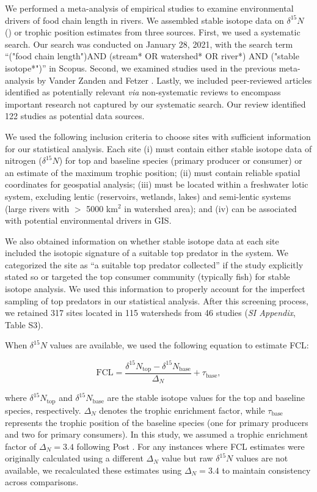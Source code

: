 \documentclass[11pt, class=article, crop=false]{standalone}
\begin{document}
We performed a meta-analysis of empirical studies to examine environmental drivers of food chain length in rivers.
We assembled stable isotope data on $\delta^{15} N$ (\textperthousand) or trophic position estimates from three sources.
First, we used a systematic search. 
Our search was conducted on January 28, 2021, with the search term ``("food chain length")AND (stream* OR watershed* OR river*) AND ("stable isotope*")'' in Scopus.
Second, we examined studies used in the previous meta-analysis by Vander Zanden and Fetzer \citep{vander_zanden_global_2007}.
Lastly, we included peer-reviewed articles identified as potentially relevant \textit{via} non-systematic reviews to encompass important research not captured by our systematic search.
Our review identified 122 studies as potential data sources.

We used the following inclusion criteria to choose sites with sufficient information for our statistical analysis.
Each site (i) must contain either stable isotope data of nitrogen ($\delta^{15}N$) for top and baseline species (primary producer or consumer) or an estimate of the maximum trophic position; 
(ii) must contain reliable spatial coordinates for geospatial analysis; 
(iii) must be located within a freshwater lotic system, excluding lentic (reservoirs, wetlands, lakes) and semi-lentic systems (large rivers with $>$ 5000 km$^2$ in watershed area); and (iv) can be associated with potential environmental drivers in GIS.

We also obtained information on whether stable isotope data at each site included the isotopic signature of a suitable top predator in the system.
We categorized the site as ``a suitable top predator collected'' if the study explicitly stated so or targeted the top consumer community (typically fish) for stable isotope analysis.
We used this information to properly account for the imperfect sampling of top predators in our statistical analysis.
After this screening process, we retained 317 sites located in 115 watersheds from 46 studies (\textit{SI Appendix}, Table S3). 

When $\delta^{15}N$ values are available, we used the following equation to estimate FCL:

\begin{equation}
    \mbox{FCL} = \frac{\delta^{15}N_{\text{top}} - \delta^{15}N_{\text{base}}}{\Delta_N} + \tau_{\text{base}},
    \label{eq:fcl-si}
\end{equation}

where $\delta^{15}N_{\text{top}}$ and $\delta^{15}N_{\text{base}}$ are the stable isotope values for the top and baseline species, respectively.
$\Delta_{N}$ denotes the trophic enrichment factor, while $\tau_{\text{base}}$ represents the trophic position of the baseline species (one for primary producers and two for primary consumers). 
In this study, we assumed a trophic enrichment factor of $\Delta_{N} = 3.4$ following Post \citep{post_using_2002}.
For any instances where FCL estimates were originally calculated using a different $\Delta_{N}$ value but raw $\delta^{15}N$ values are not available, we recalculated these estimates using $\Delta_{N} = 3.4$ to maintain consistency across comparisons.
\end{document}
